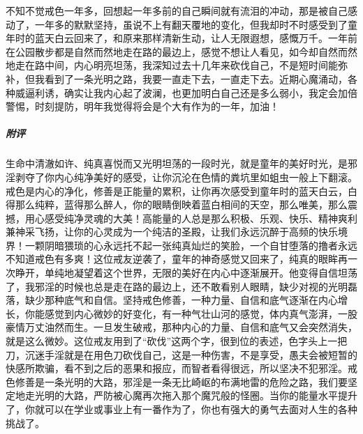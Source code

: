 \begin{case}
    不知不觉戒色一年多，回想起一年多前的自己瞬间就有流泪的冲动，那是被自己感动了，一年多的默默坚持，虽说不上有翻天覆地的变化，但我却时不时感受到了童年时的蓝天白云回来了，和原来那样清新生动，让人无限遐想，感慨万千。一年前在公园散步都是自然而然地走在路的最边上，感觉不想让人看见，如今却自然而然地走在路中间，内心明亮坦荡，我深知过去十几年来砍伐自己，不是短时间能弥补，但我看到了一条光明之路，我要一直走下去，一直走下去。近期心魔涌动，各种威逼利诱，确实让我内心起了波澜，也更加明白自己还是多么弱小，我定会加倍警惕，时刻提防，明年我觉得将会是个大有作为的一年，加油！
    \subparagraph{附评} 生命中清澈如许、纯真喜悦而又光明坦荡的一段时光，就是童年的美好时光，是邪淫剥夺了你内心纯净美好的感受，让你沉沦在色情的粪坑里如蛆虫一般上下翻滚。戒色是内心的净化，修善是正能量的累积，让你再次感受到童年时的蓝天白云，白得那么纯粹，蓝得那么醉人，你的眼睛倒映着蓝白相间的天空，那么唯美，那么震撼，用心感受纯净灵魂的大美！高能量的人总是那么积极、乐观、快乐、精神爽利兼神采飞扬，让你的心灵成为一个纯洁的圣殿，让我们永远沉醉于高频的快乐境界！一颗阴暗猥琐的心永远托不起一张纯真灿烂的笑脸，一个自甘堕落的撸者永远不知道戒色有多爽！这位戒友逆袭了，童年的神奇感觉又回来了，纯真的眼眸再一次睁开，单纯地凝望着这个世界，无限的美好在内心中逐渐展开。他变得自信坦荡了，我邪淫的时候也总是走在路的最边上，还不敢看别人眼睛，缺少对视的光明磊落，缺少那种底气和自信。坚持戒色修善，一种力量、自信和底气逐渐在内心增长，你能感觉到内心微妙的好变化，有一种气壮山河的感觉，体内真气澎湃，一股豪情万丈油然而生。一旦发生破戒，那种内心的力量、自信和底气又会突然消失，就是这么微妙。这位戒友用到了“砍伐”这两个字，很到位的表述，色字头上一把刀，沉迷手淫就是在用色刀砍伐自己，这是一种伤害，不是享受，愚夫会被短暂的快感所欺骗，看不到之后的恶果和报应，而智者看得很远，所以坚决不犯邪淫。戒色修善是一条光明的大路，邪淫是一条无比崎岖的布满地雷的危险之路，我们要坚定地走光明的大路，严防被心魔再次拖入那个魔咒般的怪圈。当你的能量水平提升了，你就可以在学业或事业上有一番作为了，你也有强大的勇气去面对人生的各种挑战了。
\end{case}

